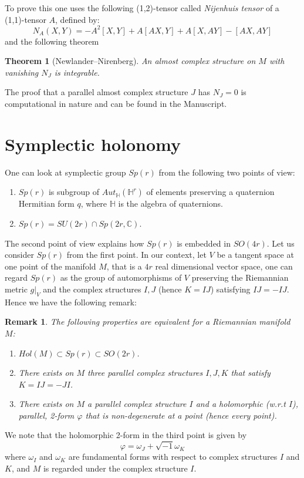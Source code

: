 \documentclass[11pt]{article}
\newtheorem{remark}{Remark}
\newtheorem{theorem}{Theorem}
\begin{document}
To prove this one uses the following (1,2)-tensor called \emph{Nijenhuis tensor} of a (1,1)-tensor \(A\), defined by:
\[
N_A(X,Y) = -A^2[X,Y] +A[AX, Y] + A[X, AY] - [AX, AY]
\]
and the following theorem
\begin{theorem}[Newlander–Nirenberg]
An almost complex structure on \(M\) with vanishing \(N_J\) is integrable.
\end{theorem}

The proof that a parallel almost complex structure \(J\) has \(N_J = 0\) is computational in
nature and can be found in the Manuscript.

\section{Symplectic holonomy}
\label{sec:org9771caf}
One can look at symplectic group \(Sp(r)\) from the following two points of view:
\begin{enumerate}
\item \(Sp(r)\) is subgroup of \(Aut_{\mathbb{H}}(\mathbb{H}^r)\) of elements preserving a quaternion
Hermitian form \(q\), where \(\mathbb{H}\) is the algebra of quaternions.
\item \(Sp(r) = SU(2r)\cap Sp(2r, \mathbb{C})\).
\end{enumerate}

The second point of view explains how \(Sp(r)\) is embedded in \(SO(4r)\). Let us consider \(Sp(r)\) from
the first point. In our context, let \(V\) be a tangent space at one point of the manifold \(M\), that
is a \(4r\) real dimensional vector space, one can regard \(Sp(r)\) as the group of automorphisms of \(V\)
preserving the Riemannian metric \(g|_V\) and the complex structures \(I,J\) (hence \(K=IJ\)) satisfying
\(IJ = -IJ\). Hence we have the following remark:

\begin{remark}
The following properties are equivalent for a Riemannian manifold \(M\):
\begin{enumerate}
\item \(Hol(M) \subset Sp(r)\subset SO(2r)\).
\item There exists on \(M\) three parallel complex structures \(I,J,K\) that satisfy \(K = IJ = -JI\).
\item There exists on \(M\) a parallel complex structure \(I\) and a holomorphic (w.r.t \(I\)), parallel,
2-form \(\varphi\) that is non-degenerate at a point (hence every point).
\end{enumerate}
\end{remark}
We note that the holomorphic 2-form in the third point is given by
\[
\varphi = \omega_J + \sqrt{-1}\omega_K
\]
where \(\omega_I\) and \(\omega_K\) are fundamental forms with respect to complex structures \(I\) and
\(K\), and \(M\) is regarded under the complex structure \(I\).
\end{document}
